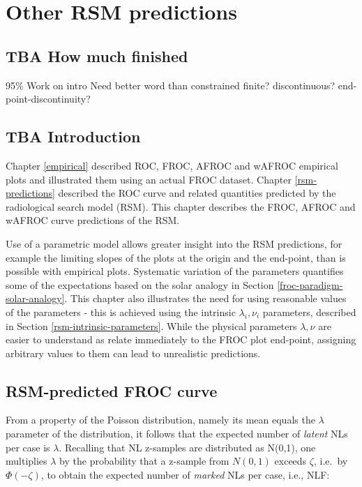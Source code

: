 \documentclass[
]{book}
\begin{document}
\hypertarget{rsm-other-predictions}{%
\chapter{Other RSM predictions}\label{rsm-other-predictions}}

\hypertarget{rsm-other-predictions-how-much-finished}{%
\section{TBA How much finished}\label{rsm-other-predictions-how-much-finished}}

95\%
Work on intro
Need better word than constrained
finite? discontinuous? end-point-discontinuity?

\hypertarget{rsm-other-predictions-intro}{%
\section{TBA Introduction}\label{rsm-other-predictions-intro}}

Chapter \ref{empirical} described ROC, FROC, AFROC and wAFROC empirical plots and illustrated them using an actual FROC dataset. Chapter \ref{rsm-predictions} described the ROC curve and related quantities predicted by the radiological search model (RSM). This chapter describes the FROC, AFROC and wAFROC curve predictions of the RSM.

Use of a parametric model allows greater insight into the RSM predictions, for example the limiting slopes of the plots at the origin and the end-point, than is possible with empirical plots. Systematic variation of the parameters quantifies some of the expectations based on the solar analogy in Section \ref{froc-paradigm-solar-analogy}. This chapter also illustrates the need for using reasonable values of the parameters - this is achieved using the intrinsic \(\lambda_i, \nu_i\) parameters, described in Section \ref{rsm-intrinsic-parameters}. While the physical parameters \(\lambda, \nu\) are easier to understand as relate immediately to the FROC plot end-point, assigning arbitrary values to them can lead to unrealistic predictions.

\hypertarget{rsm-other-predictions-froc-curve}{%
\section{RSM-predicted FROC curve}\label{rsm-other-predictions-froc-curve}}

From a property of the Poisson distribution, namely its mean equals the \(\lambda\) parameter of the distribution, it follows that the expected number of \emph{latent} NLs per case is \(\lambda\). Recalling that NL z-samples are distributed as N(0,1), one multiplies \(\lambda\) by the probability that a z-sample from \(N(0,1)\) exceeds \(\zeta\), i.e.~by \(\Phi(-\zeta)\), to obtain the expected number of \emph{marked} NLs per case, i.e., NLF:
\end{document}
